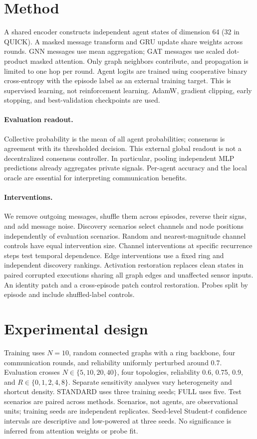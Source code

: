 \documentclass[11pt]{article}
\begin{document}
\section{Method}
A shared encoder constructs independent agent states of dimension 64 (32 in QUICK). A masked message transform and GRU update share weights across rounds. GNN messages use mean aggregation; GAT messages use scaled dot-product masked attention. Only graph neighbors contribute, and propagation is limited to one hop per round. Agent logits are trained using cooperative binary cross-entropy with the episode label as an external training target. This is supervised learning, not reinforcement learning. AdamW, gradient clipping, early stopping, and best-validation checkpoints are used.
\paragraph{Evaluation readout.} Collective probability is the mean of all agent probabilities; consensus is agreement with its thresholded decision. This external global readout is not a decentralized consensus controller. In particular, pooling independent MLP predictions already aggregates private signals. Per-agent accuracy and the local oracle are essential for interpreting communication benefits.
\paragraph{Interventions.} We remove outgoing messages, shuffle them across episodes, reverse their signs, and add message noise. Discovery scenarios select channels and node positions independently of evaluation scenarios. Random and nearest-magnitude channel controls have equal intervention size. Channel interventions at specific recurrence steps test temporal dependence. Edge interventions use a fixed ring and independent discovery rankings. Activation restoration replaces clean states in paired corrupted executions sharing all graph edges and unaffected sensor inputs. An identity patch and a cross-episode patch control restoration. Probes split by episode and include shuffled-label controls.
\section{Experimental design}
Training uses $N=10$, random connected graphs with a ring backbone, four communication rounds, and reliability uniformly perturbed around 0.7. Evaluation crosses $N\in\{5,10,20,40\}$, four topologies, reliability 0.6, 0.75, 0.9, and $R\in\{0,1,2,4,8\}$. Separate sensitivity analyses vary heterogeneity and shortcut density. STANDARD uses three training seeds; FULL uses five. Test scenarios are paired across methods. Scenarios, not agents, are observational units; training seeds are independent replicates. Seed-level Student-$t$ confidence intervals are descriptive and low-powered at three seeds. No significance is inferred from attention weights or probe fit.
\end{document}
